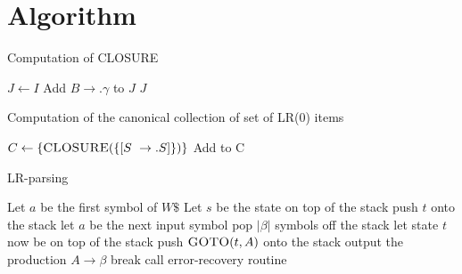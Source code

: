 \section{Algorithm}

\begin{algorithm}[!h]
	\caption{Computation of CLOSURE}
	\label{alg:closure}
	\begin{algorithmic}[1]
		 
			\State $J \gets I$
			\Repeat 
							\State Add $B \rightarrow .\gamma$ to $J$
						\EndIf
					\EndFor
				\EndFor
			\State \Return $J$
		\EndProcedure
	\end{algorithmic}
\end{algorithm}

\begin{algorithm}[!h]
	\caption{Computation of the canonical collection of set of LR(0) items}
	\label{alg:LR0Items}
	\begin{algorithmic}[1]
			\State $C \gets \{ \Call{CLOSURE}{\{[S\ \rightarrow .S]\}}\}$ 
			\Repeat
						\State Add  to C
					\EndIf
				\EndFor
			\EndFor
		\EndProcedure
	\end{algorithmic}
\end{algorithm}

\begin{algorithm}[!h]
	\caption{LR-parsing}
	\label{alg:LRparser}
	\begin{algorithmic}[1]
		\State Let $a$ be the first symbol of $W\$$
			\State Let $s$ be the state on top of the stack
				\State push $t$ onto the stack
				\State let $a$ be the next input symbol
				\State pop $|\beta|$ symbols off the stack
				\State let state $t$ now be on top of the stack
				\State push $\Call{GOTO}{t,A}$ onto the stack
				\State output the production $A \rightarrow \beta$
				\State break 
			\Else
				\State call error-recovery routine
			\EndIf
		\EndWhile
	\end{algorithmic}
\end{algorithm}


